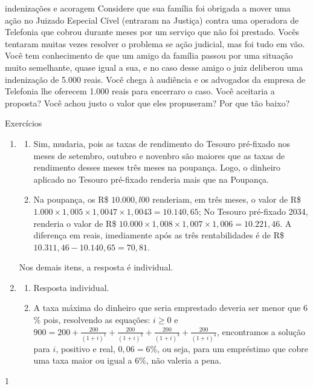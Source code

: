 \begin{task}{indenizações e acoragem}
Considere que sua família foi obrigada a mover uma ação no Juizado Especial Cível (entraram na Justiça) contra uma operadora de Telefonia que cobrou durante meses por um serviço que não foi prestado. Vocês tentaram muitas vezes resolver o problema se ação judicial, mas foi tudo em vão. Você tem conhecimento de que um amigo da família passou por uma situação muito semelhante, quase igual a sua, e no caso desse amigo o juiz deliberou uma indenização de 5.000 reais. Você chega à audiência e os advogados da empresa de Telefonia lhe oferecem 1.000 reais para encerraro o caso. Você aceitaria a proposta? Você achou justo o valor que eles propuseram? Por que tão baixo?
\end{task}

\exercise
\begin{resposta}{Exercícios}
{
  \begin{enumerate}
    \item 
    \begin{enumerate}
      \item Sim, mudaria, pois as taxas de rendimento do Tesouro pré-fixado nos meses de setembro, outubro e novenbro são maiores que as taxas de rendimento desses meses três meses na poupança. Logo, o dinheiro aplicado no Tesouro pré-fixado renderia mais que na Poupança.
      \item Na poupança, os R\$ $10.000,l00$ renderiam, em três meses, o valor de R\$ $1.000\times1{,}005\times1{,}0047\times1{,}0043=10.140{,}65$; No Tesouro pré-fixado 2034, renderia o valor de R\$ $10.000\times 1{,}008\times 1{,}007\times 1{,}006=10.221{,}46$. A diferença em reais, imediamente após as três rentabilidades é de R\$ $10.311{,}46-10.140{,}65=70{,}81$.

    \end{enumerate}
    Nos demais itens, a resposta é individual.
    \item
    \begin{enumerate}
      \item Resposta individual.
      \item A taxa máxima do dinheiro que seria emprestado deveria ser menor que $6$\% pois, resolvendo as equações: $i\geq0$ e $900=\displaystyle200+\frac{200}{(1+i)^1}+\frac{200}{(1+i)^2}+\frac{200}{(1+i)^3}+\frac{200}{(1+i)^4}$, encontramos a solução para $i$,  positivo e real, $0{,}06=6$\%, ou seja, para um empréstimo que cobre uma taxa maior ou igual a $6$\%, não valeria a pena.
    \end{enumerate}
  \end{enumerate}
}{1}
\end{resposta}

